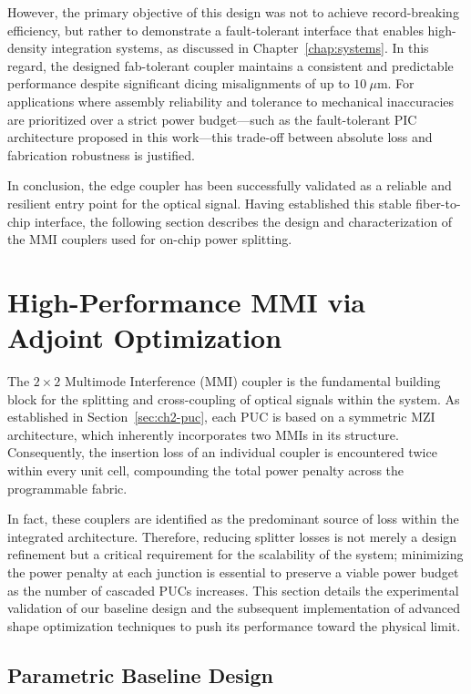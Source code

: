 However, the primary objective of this design was not to achieve record-breaking efficiency, but 
rather to demonstrate a fault-tolerant interface that enables high-density integration systems, 
as discussed in Chapter~\ref{chap:systems}. In this regard, the designed fab-tolerant coupler 
maintains a consistent and predictable performance despite significant dicing misalignments of up 
to $10~\mu\text{m}$. For applications where assembly reliability and tolerance to mechanical 
inaccuracies are prioritized over a strict power budget—such as the fault-tolerant PIC architecture 
proposed in this work—this trade-off between absolute loss and fabrication robustness is justified.

In conclusion, the edge coupler has been successfully validated as a reliable and resilient entry 
point for the optical signal. Having established this stable fiber-to-chip interface, the following 
section describes the design and characterization of the MMI couplers used for on-chip power 
splitting.


\section{High-Performance MMI via Adjoint Optimization}  

\label{sec:mmi_adjoint}

The $2\times2$ Multimode Interference (MMI) coupler is the fundamental building block for the 
splitting and cross-coupling of optical signals within the system. As established in 
Section~\ref{sec:ch2-puc}, each PUC is based on a symmetric MZI architecture, which inherently 
incorporates two MMIs in its structure. Consequently, the insertion loss of an individual coupler 
is encountered twice within every unit cell, compounding the total power penalty across the 
programmable fabric.

In fact, these couplers are identified as the predominant source of loss within the integrated 
architecture. Therefore, reducing splitter losses is not merely a design refinement but a critical 
requirement for the scalability of the system; minimizing the power penalty at each junction is 
essential to preserve a viable power budget as the number of cascaded PUCs increases. This section 
details the experimental validation of our baseline design and the subsequent implementation of 
advanced shape optimization techniques to push its performance toward the physical limit.

\subsection{Parametric Baseline Design}\label{subsec:baseline_mmi}

